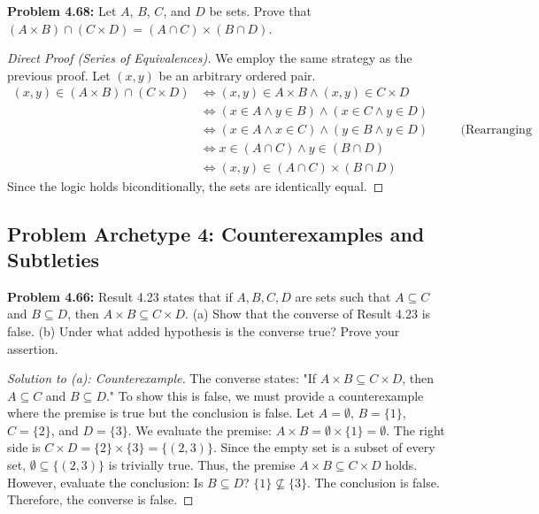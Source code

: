 \documentclass[12pt]{article}
\theoremstyle{definition}
\theoremstyle{remark}
\begin{document}
\vspace{0.5cm}

\textbf{Problem 4.68:} Let $A$, $B$, $C$, and $D$ be sets. Prove that $(A \times B) \cap (C \times D) = (A \cap C) \times (B \cap D)$.

\begin{proof}[Direct Proof (Series of Equivalences)]
We employ the same strategy as the previous proof. Let $(x,y)$ be an arbitrary ordered pair.
\begin{align*}
(x, y) \in (A \times B) \cap (C \times D) &\iff (x, y) \in A \times B \land (x, y) \in C \times D \\
&\iff (x \in A \land y \in B) \land (x \in C \land y \in D) \\
&\iff (x \in A \land x \in C) \land (y \in B \land y \in D) \quad &&\text{(Rearranging terms)} \\
&\iff x \in (A \cap C) \land y \in (B \cap D) \\
&\iff (x, y) \in (A \cap C) \times (B \cap D)
\end{align*}
Since the logic holds biconditionally, the sets are identically equal. 
\end{proof}

\subsection{Problem Archetype 4: Counterexamples and Subtleties}

\textbf{Problem 4.66:} Result 4.23 states that if $A, B, C, D$ are sets such that $A \subseteq C$ and $B \subseteq D$, then $A \times B \subseteq C \times D$.
(a) Show that the converse of Result 4.23 is false.
(b) Under what added hypothesis is the converse true? Prove your assertion.

\begin{proof}[Solution to (a): Counterexample]
The converse states: "If $A \times B \subseteq C \times D$, then $A \subseteq C$ and $B \subseteq D$."
To show this is false, we must provide a counterexample where the premise is true but the conclusion is false.
Let $A = \emptyset$, $B = \{1\}$, $C = \{2\}$, and $D = \{3\}$.
We evaluate the premise: $A \times B = \emptyset \times \{1\} = \emptyset$.
The right side is $C \times D = \{2\} \times \{3\} = \{(2,3)\}$.
Since the empty set is a subset of every set, $\emptyset \subseteq \{(2,3)\}$ is trivially true. Thus, the premise $A \times B \subseteq C \times D$ holds.
However, evaluate the conclusion: Is $B \subseteq D$? $\{1\} \not\subseteq \{3\}$. The conclusion is false. Therefore, the converse is false.
\end{proof}
\end{document}
